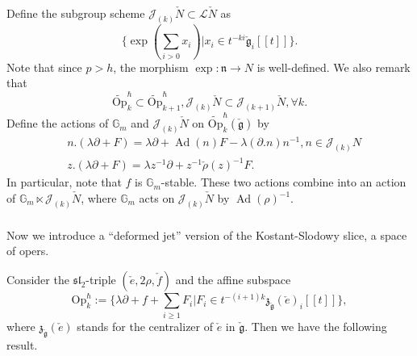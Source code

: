 \documentclass{amsart}
\theoremstyle{definition}
\newcommand{\slf}{\mathfrak{sl}}
\newcommand{\sss}{\subsubsection{}}
\newcommand{\on}{\mathrm}
\newcommand{\g}{\mathfrak{g}}
\newcommand{\Jet}{\mathscr{J}}
\newcommand{\Loop}{\mathscr{L}}
\newcommand{\Op}{\on{Op}}
\numberwithin{equation}{section}
\begin{document}
Define the subgroup scheme $\Jet_{(k)} \check{N}\subset \Loop \check{N}$ as 
$$\{\exp(\sum_{i>0}x_i)| x_i\in t^{-ki}\check{\g}_{i}[[t]]\}.$$
Note that since $p>h$, the morphism $\exp:\mathfrak{n}\rightarrow N$ is well-defined.
We also remark that 
$$\widetilde{\Op}^\hbar_k\subset 
\widetilde{\Op}^\hbar_{k+1}, \Jet_{(k)} \check{N}\subset 
\Jet_{(k+1)}\check{N}, \forall k.$$
Define the actions of $\mathbb{G}_m$ and $\Jet_{(k)} \check{N}$ on  $\widetilde{\Op}^\hbar_k(\check{\g})$ by 
\begin{equation}\label{eq:Kostant_actions}
\begin{split}
&n.(\lambda\partial+F)=\lambda\partial+\operatorname{Ad}(n)F-\lambda(\partial. n)n^{-1}, n\in \Jet_{(k)} N\\
&z.(\lambda\partial+F)=\lambda z^{-1}\partial+ z^{-1}\check{\rho}(z)^{-1}F.
\end{split}
\end{equation}
In particular, note that $f$ is $\mathbb{G}_m$-stable. 
These two actions combine into an action of $\mathbb{G}_m\ltimes \Jet_{(k)} \check{N}$, where $\mathbb{G}_m$ acts on $\Jet_{(k)} \check{N}$ by $\operatorname{Ad}(\rho)^{-1}$.

\sss\label{SSS_opers_coord}
Now we introduce a ``deformed jet'' version of the Kostant-Slodowy slice, a space of opers. 

Consider the $\slf_2$-triple $(\check{e},2\rho,\check{f})$ and 
the affine subspace 
$$\Op^\hbar_k:=\{\lambda\partial+f+\sum_{i\geqslant 1}F_i| F_i\in t^{-(i+1)k}\mathfrak{z}_{\check{\g}}(\check{e})_i[[t]]\},$$
where $\mathfrak{z}_{\check{\g}}(\check{e})$ stands for the centralizer of $\check{e}$ in $\check{\g}$.
Then we have the following result. 
\end{document}
